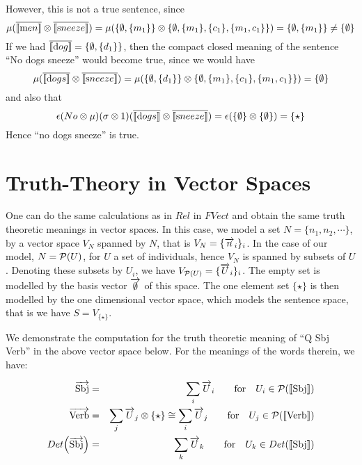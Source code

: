 \noindent
However, this is not a true sentence, since  
\[
\mu(\overline{[\![ \text men ]\!]} \otimes \overline{[\![ \text sneeze ]\!]}) = \mu(\{\emptyset, \{m_1\}\} \otimes \{\emptyset, \{m_1\}, \{c_1\}, \{m_1, c_1\}\}) = \{\emptyset, \{m_1\}\}   \neq \{\emptyset\}
\]
 If we had $\overline{[\![ \text dog ]\!]} = \{\emptyset, \{d_1\}\}$, then the compact closed meaning of the sentence ``No dogs sneeze''  would become true, since we would have
\[
\mu(\overline{[\![ \text dogs ]\!]} \otimes \overline{[\![ \text sneeze ]\!]}) = \mu(\{\emptyset, \{d_1\}\} \otimes \{\emptyset, \{m_1\}, \{c_1\}, \{m_1, c_1\}\}) = \{\emptyset\}
\]
and also that  
\[
\epsilon(No \otimes \mu)(\sigma \otimes 1) (\overline{[\![ \text dogs ]\!]} \otimes \overline{[\![ \text sneeze ]\!]})=  \epsilon(\{\emptyset\}  \otimes \{\emptyset\}) = \{\star\}
\]
Hence ``no dogs sneeze'' is true. 

\section{Truth-Theory in Vector Spaces} 

One can do the same calculations as in $Rel$ in $FVect$ and obtain the same truth theoretic meanings in vector spaces. In this case, we  model a set $N = \{n_1, n_2, \cdots\}$, by a vector space $V_N$ spanned by $N$, that is $V_N = \{\overrightarrow{n}_i\}_i$. In the case of our model, $N = {\cal P}(U)$, for $U$ a set of individuals, hence $V_N$ is spanned by subsets of $U$.  Denoting these subsets by $U_i$, we have $V_{{\cal P}(U)} = \{\overrightarrow{U}_i\}_i$. The  empty set is modelled by  the basis vector $\overrightarrow{\emptyset}$ of this space. The one element set $\{\star\}$ is then modelled  by the one dimensional vector space, which  models the sentence space, that is we have $S =  V_{\{\star\}}$.  

We demonstrate the computation for the truth theoretic meaning of ``Q Sbj Verb'' in the above vector space below. For the meanings of the words therein, we have:

\begin{eqnarray*}
\overrightarrow{\text{Sbj}} &=& \sum_i \overrightarrow{U}_i \qquad \text{for} \quad U_i \in {\cal P}([\![ \text{Sbj} ]\!])\\
\overrightarrow{\text{Verb}} &=& \sum_j \overrightarrow{U}_j  \otimes \{\star\} \cong \sum_i \overrightarrow{U}_j  \qquad \text{for} \quad  U_j \in {\cal P}([\![ \text{Verb} ]\!])\\
Det\Big(\overrightarrow{\text{Sbj}}\Big) &=& \sum_k \overrightarrow{U}_k \qquad \text{for} \quad   U_k \in Det([\![ \text{Sbj} ]\!])
\end{eqnarray*}




